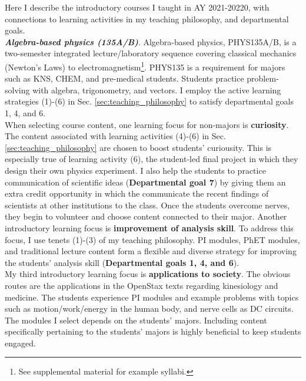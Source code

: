 \documentclass[../../../main.tex]{subfiles}
\begin{document}
\label{sec:intro_course_desc}

Here I describe the introductory courses I taught in AY 2021-20220, with connections to learning activities in my teaching philosophy, and departmental goals.
\\
\vspace{0.15cm}
\textbf{\textit{Algebra-based physics (135A/B)}}. Algebra-based physics, PHYS135A/B, is a two-semester integrated lecture/laboratory sequence covering classical mechanics (Newton's Laws) to electromagnetism\footnote{See supplemental material for example syllabi.}.  PHYS135 is a requirement for majors such as KNS, CHEM, and pre-medical students.  Students practice problem-solving with algebra, trigonometry, and vectors.  I employ the active learning strategies (1)-(6) in Sec. \ref{sec:teaching_philosophy} to satisfy departmental goals 1, 4, and 6.
\\
\vspace{0.15cm}
When selecting course content, one learning focus for non-majors is \textbf{curiosity}.  The content associated with learning activities (4)-(6) in Sec. \ref{sec:teaching_philosophy} are chosen to boost students' curiousity.  This is especially true of learning activity (6), the student-led final project in which they design their own physics experiment.  I also help the students to practice communication of scientific ideas (\textbf{Departmental goal 7}) by giving them an extra credit opportunity in which the communicate the recent findings of scientists at other institutions to the class.  Once the students overcome nerves, they begin to volunteer and choose content connected to their major.  Another introductory learning focus is \textbf{improvement of analysis skill}.  To address this focus, I use tenets (1)-(3) of my teaching philosophy.  PI modules, PhET modules, and traditional lecture content form a flexible and diverse strategy for improving the students' analysis skill (\textbf{Departmental goals 1, 4, and 6}).
\\
\vspace{0.15cm}
My third introductory learning focus is \textbf{applications to society}.  The obvious routes are the applications in the OpenStax texts \cite{openstax1} regarding kinesiology and medicine.  The students experience PI modules and example problems with topics such as motion/work/energy in the human body, and nerve cells as DC circuits.  The modules I select depends on the students' majors.  Including content specifically pertaining to the students' majors is highly beneficial to keep students engaged.
\end{document}
